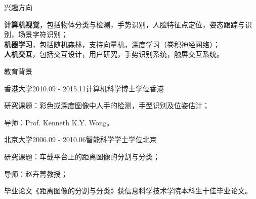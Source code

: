 \documentclass[UTF8]{cv_professional-cn} %
\begin{document}

\begin{rSection}{兴趣方向}

{\bf 计算机视觉}，包括物体分类与检测，手势识别，人脸特征点定位，姿态跟踪与识别，场景字符识别；\\
{\bf 机器学习}，包括随机森林，支持向量机，深度学习（卷积神经网络）； \\
{\bf 人机交互}，包括交互设计，用户研究，手势识别系统，触屏交互系统。

\end{rSection}


\begin{rSection}{教育背景}

\begin{rSubsection}{香港大学}{2010.09 - 2015.11}{计算机科学博士学位}{香港}
	\item 研究课题：彩色或深度图像中人手的检测，手型识别及位姿估计；
	\item 导师：Prof. Kenneth K.Y. Wong。
\end{rSubsection}

\begin{rSubsection}{北京大学}{2006.09 - 2010.06}{智能科学学士学位}{北京}
	\item 研究课题：车载平台上的距离图像的分割与分类；
	\item 导师：赵卉菁教授；
	\item 毕业论文《距离图像的分割与分类》获信息科学技术学院本科生十佳毕业论文。
\end{rSubsection}
\end{rSection}

\end{document}
